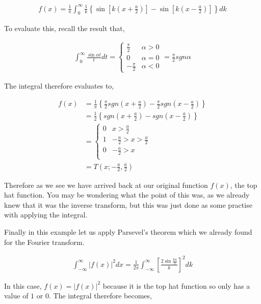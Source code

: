 \documentclass[11pt]{amsart}
\begin{document}
\begin{align*}
  f(x) = \frac{1}{\pi}\int_0^{\infty}\frac{1}{k}\left\{\sin{\left[k\left(x+\frac{a}{2}\right)\right]} - \sin{\left[k\left(x-\frac{a}{2}\right)\right]}\right\} dk
\end{align*}

To evaluate this, recall the result that,

\begin{align*}
  \int_0^{\infty} \frac{\sin{\alpha t}}{t} dt =
  \begin{cases}
    \frac{\pi}{2} & \alpha > 0 \\
    0 & \alpha = 0 \\
    -\frac{\pi}{2} & \alpha < 0
  \end{cases} = \frac{\pi}{2} sgn \alpha
\end{align*}

The integral therefore evaluates to,

\begin{align*}
  f(x) &= \frac{1}{\pi}\left\{\frac{\pi}{2} sgn\left(x+\frac{a}{2}\right) - \frac{\pi}{2} sgn\left(x-\frac{a}{2}\right)\right\} \\
       &= \frac{1}{2}\left\{sgn\left(x+\frac{a}{2}\right) - sgn\left(x-\frac{a}{2}\right)\right\} \\
       &=
  \begin{cases}
    0 & x > \frac{a}{2} \\
    1 & -\frac{a}{2} > x > \frac{a}{2} \\
    0 & -\frac{a}{2} > x \\
  \end{cases} \\
  &= T(x; -\frac{a}{2}, \frac{a}{2})
\end{align*}

Therefore as we see we have arrived back at our original function $f(x)$, the top hat function. You may be wondering what the point of this was, as we already knew that it was the inverse transform, but this was just done as some practise with applying the integral.

Finally in this example let us apply Parsevel's theorem which we already found for the Fourier transform.

\begin{align*}
  \int_{-\infty}^{\infty} {|f(x)|}^2 dx = \frac{1}{2\pi}\int_{-\infty}^{\infty}{\left[\frac{2\sin{\frac{ka}{2}}}{k}\right]}^2 dk
\end{align*}

In this case, $f(x) = {|f(x)|}^2$ because it is the top hat function so only has a value of $1$ or $0$. The integral therefore becomes,
\end{document}
